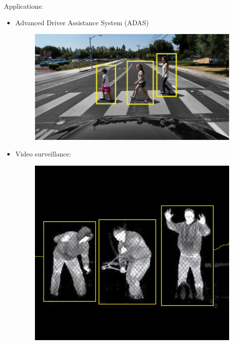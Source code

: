 \documentclass{beamer}[10pt, usepdftitle=false, handout]
\begin{document}
	\begin{frame}
	
	Applications:
	\vspace*{1em}
	
	\begin{itemize}
	\item{Advanced Driver Assistance System (ADAS)
	\begin{figure}
		\includegraphics[scale=0.2]{21.jpg} 
	\end{figure}		}
	\item{Video surveillance:
	\begin{figure}
		\includegraphics[scale=0.9]{22.jpg} 
	\end{figure}	}
	
	\end{itemize}
	
    \end{frame}	 
	
\end{document}
